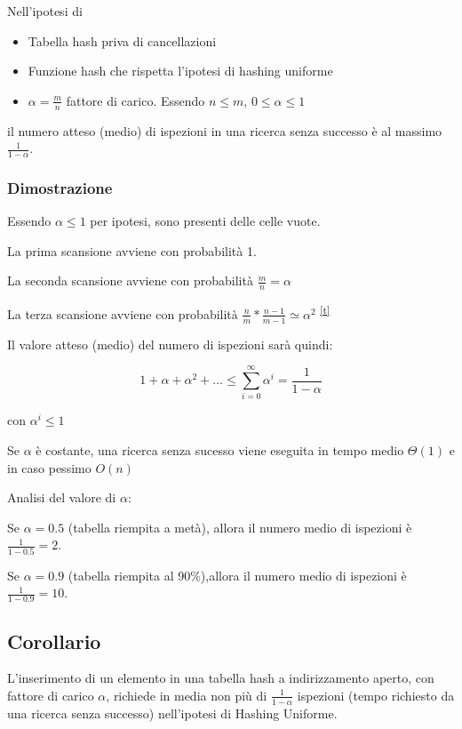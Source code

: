 \documentclass[11pt,a4paper,twoside,openright]{book}
\providecommand{\tightlist}{\setlength{\itemsep}{0pt}\setlength{\parskip}{0pt}}
\begin{document}
{Nell'ipotesi di}

\begin{itemize}
\tightlist
\item
  {Tabella hash priva di cancellazioni}
\item
  {Funzione hash che rispetta l'ipotesi di hashing uniforme}
\item
  {$\alpha = \frac{m}{n}$ fattore di carico. Essendo $n \leq m$, $0 \leq \alpha \leq 1$}
\end{itemize}

{il numero atteso (medio) di ispezioni in una ricerca senza successo è al massimo $\frac{1}{1-\alpha}$.}

\subsubsection{Dimostrazione}

{Essendo $\alpha \leq 1$ per ipotesi, sono presenti delle celle vuote.}

{La prima scansione avviene con probabilità 1.}

{La seconda scansione avviene con probabilità $\frac{m}{n} = \alpha$}

{La terza scansione avviene con probabilità $\frac{n}{m} * \frac{n-1}{m-1} \simeq \alpha^2 $}
\textsuperscript{\protect\hyperlink{cmnt20}{{[}t{]}}}

{Il valore atteso (medio) del numero di ispezioni sarà quindi:}

\begin{equation}
1+\alpha+\alpha^2+\ldots \leq \sum_{i=0}^{\infty}{\alpha^i} = \frac{1}{1-\alpha}
\end{equation}

{con $\alpha^i\leq1$}

{Se $\alpha$ è costante, una ricerca senza sucesso viene eseguita in tempo medio $\Theta(1)$ e in caso pessimo $O(n)$}

{Analisi del valore di $\alpha$:}

{Se $\alpha=0.5$ (tabella riempita a metà), allora il numero medio di ispezioni è $\frac{1}{1-0.5}=2$.}

{Se $\alpha=0.9$ (tabella riempita al 90\%),allora il numero medio di ispezioni è $\frac{1}{1-0.9}=10$.}

\subsection{Corollario}

{L'inserimento di un elemento in una tabella hash a indirizzamento aperto, con fattore di carico $\alpha$, richiede in media non più di $\frac{1}{1-\alpha}$ ispezioni (tempo richiesto da una ricerca senza successo) nell'ipotesi di Hashing Uniforme.}
\end{document}
